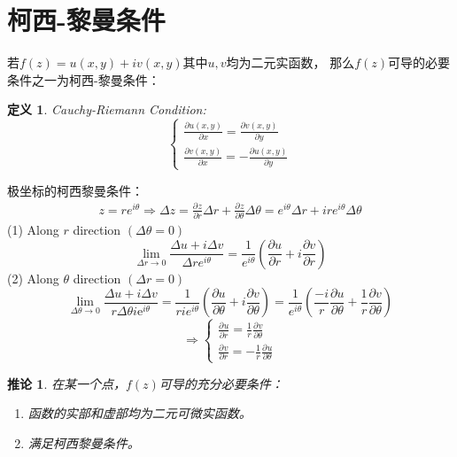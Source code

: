 \documentclass[10pt, a4paper, oneside]{ctexbook}
\newtheorem{definition}[theorem]{定义}
\newtheorem{corollary}[theorem]{推论}
\def\de{\ensuremath{\Delta}}
\newcommand{\partdev}[3][]
{\ensuremath{\frac{\displaystyle \partial^{#1} #2}{ \displaystyle \partial #3}}}
\begin{document}
\section{柯西-黎曼条件}
若$f(z)=u(x,y)+iv(x,y)$其中$u,v$均为二元实函数，
那么$f(z)$可导的必要条件之一为柯西-黎曼条件：
\begin{definition}{\rm Cauchy-Riemann Condition}:
    $$
        \left\{
        \begin{aligned}
            \frac{\displaystyle \partial u(x,y)}{ \displaystyle \partial x}=\frac{\displaystyle \partial v(x,y)}{\displaystyle \partial y} \\
            \frac{\displaystyle \partial v(x,y)}{ \displaystyle \partial x}=-\frac{\displaystyle \partial u(x,y)}{\displaystyle \partial y}
        \end{aligned}
        \right.
    $$
\end{definition}
极坐标的柯西黎曼条件：
\begin{align*}
    z=re^{i\theta}\Rightarrow \de z = \partdev{z}{r} \de r+ \partdev{z}{\theta} \de \theta =e^{i\theta}\de r + ire^{i\theta}\de \theta
\end{align*}
(1) Along $r$ direction $(\Delta \theta=0)$
\begin{equation*}
    \lim _{\Delta r \rightarrow 0} \frac{\Delta u+i \Delta v}{\Delta r e^{i \theta}}=\frac{1}{e^{i \theta}}\left(\frac{\partial u}{\partial r}+i \frac{\partial v}{\partial r}\right)
\end{equation*}
(2) Along $\theta$ direction $(\Delta r=0)$
\begin{equation*}
    \lim _{\Delta \theta \rightarrow 0} \frac{\Delta u+i \Delta v}{r \Delta \theta i \mathrm{e}^{i \theta}}=\frac{1}{r i e^{i \theta}}\left(\frac{\partial u}{\partial \theta}+i \frac{\partial v}{\partial \theta}\right)=\frac{1}{e^{i \theta}}\left(\frac{-i}{r} \frac{\partial u}{\partial \theta}+\frac{1}{r} \frac{\partial v}{\partial \theta}\right)
\end{equation*}
\begin{equation*}
    \Rightarrow \begin{cases} \displaystyle
        \partdev{u}{r}=\frac{1}{r} \partdev{v}{\theta} \\
        \displaystyle \partdev{v}{r}=-\frac{1}{r} \partdev{u}{\theta}
    \end{cases}
\end{equation*}
\begin{corollary}
    在某一个点，$f(z)$可导的充分必要条件：
    \begin{enumerate}
        \item 函数的实部和虚部均为二元可微实函数。
        \item 满足柯西黎曼条件。
    \end{enumerate}
\end{corollary}
\end{document}
